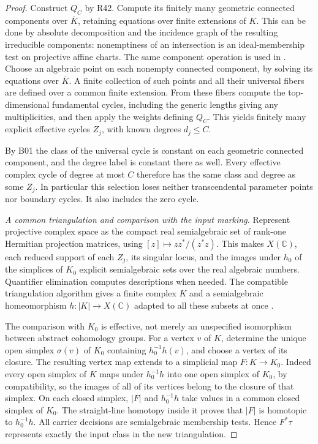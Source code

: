 \begin{proof}
Construct $Q_C$ by R42. Compute its finitely many geometric connected
components over $\overline K$, retaining equations over finite
extensions of $K$. This can be done by absolute decomposition and
the incidence graph of the resulting irreducible components:
nonemptiness of an intersection is an ideal-membership test on
projective affine charts. The same component operation is used in
\cite[Lemma 8.29(c)(iv), author PDF p.~17]{PoonenTestaVanLuijk}.
Choose an algebraic point on each nonempty connected component, by
solving its equations over $\overline K$. A finite collection of
such points and all their universal fibers are defined over a common
finite extension. From these fibers compute the top-dimensional
fundamental cycles, including the generic lengths giving any
multiplicities, and then apply the weights defining $Q_C$.
This yields finitely many explicit effective cycles $Z_j$, with
known degrees $d_j\leq C$.

By B01 the class of the universal cycle is constant on each
geometric connected component, and the degree label is constant
there as well. Every effective complex cycle of degree at most $C$
therefore has the same class and degree as some $Z_j$. In particular
this selection loses neither transcendental parameter points nor
boundary cycles. It also includes the zero cycle.

\emph{A common triangulation and comparison with the input marking.}
Represent projective complex space as the compact real semialgebraic
set of rank-one Hermitian projection matrices, using
$[z]\mapsto zz^*/(z^*z)$. This makes $X(\mathbb C)$, each reduced
support of each $Z_j$, its singular locus, and the images under $h_0$
of the simplices of $K_0$ explicit semialgebraic sets over the real
algebraic numbers. Quantifier elimination computes descriptions when
needed. The compatible triangulation algorithm gives a finite
complex $K$ and a semialgebraic homeomorphism
$h:|K|\to X(\mathbb C)$ adapted to all these subsets at once
\cite[Theorem 4.5, author PDF p.~14]{BasuTriangulation}.

The comparison with $K_0$ is effective, not merely an unspecified
isomorphism between abstract cohomology groups. For a vertex $v$ of
$K$, determine the unique open simplex $\sigma(v)$ of $K_0$
containing $h_0^{-1}h(v)$, and choose a vertex of its closure.
The resulting vertex map extends to a simplicial map
$F:K\to K_0$. Indeed every open simplex of $K$ maps under
$h_0^{-1}h$ into one open simplex of $K_0$, by compatibility, so the
images of all of its vertices belong to the closure of that simplex.
On each closed simplex, $|F|$ and $h_0^{-1}h$ take values in a common
closed simplex of $K_0$. The straight-line homotopy inside it proves
that $|F|$ is homotopic to $h_0^{-1}h$. All carrier decisions are
semialgebraic membership tests. Hence $F^*\tau$ represents exactly
the input class in the new triangulation.


\end{proof}
